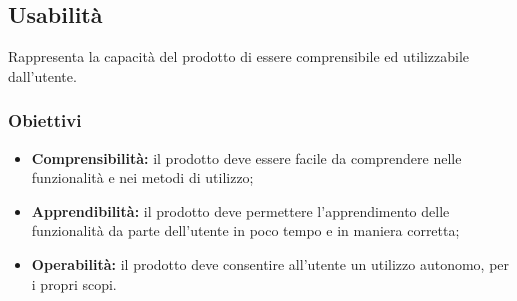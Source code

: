 %
%	
%	
%	


\subsection{Usabilità}
Rappresenta la capacità del prodotto di essere comprensibile ed utilizzabile dall'utente.
\subsubsection{Obiettivi}
\begin{itemize}
	\item \textbf{Comprensibilità:} il prodotto deve essere facile da comprendere nelle funzionalità e nei metodi di utilizzo;
	\item \textbf{Apprendibilità:} il prodotto deve permettere l'apprendimento delle funzionalità da parte dell'utente in poco tempo e in maniera corretta;
	\item \textbf{Operabilità:} il prodotto deve consentire all'utente un utilizzo autonomo, per i propri scopi.
\end{itemize}
